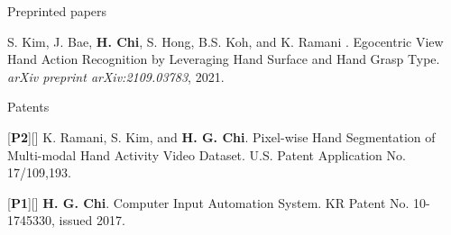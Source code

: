 \begin{cventries}
\cvpub
{Preprinted papers} %
{
\begin{cvitems}
\item {S. Kim, J. Bae, \textbf{H. Chi}, S. Hong, B.S. Koh, and K. Ramani . Egocentric View Hand Action Recognition by Leveraging Hand Surface and Hand Grasp Type. \textit{arXiv preprint arXiv:2109.03783}, 2021. }
\end{cvitems}
}

\cvpub
{Patents}{
\begin{cvitems}
\item {[\textbf{P2}][\href{https://patentimages.storage.googleapis.com/38/0d/99/aaea450434214f/US20210166393A1.pdf}{}] K. Ramani, S. Kim, and \textbf{H. G. Chi}. Pixel-wise Hand Segmentation of Multi-modal Hand Activity Video Dataset. U.S. Patent Application No. 17/109,193.}
\item {[\textbf{P1}][\href{https://docs.google.com/viewer?url=https://github.com/stnoah1/CV/raw/master/documents/patent.pdf}{}] \textbf{H. G. Chi}. Computer Input Automation System. KR Patent No. 10-1745330, issued 2017.}
\end{cvitems}
}



\end{cventries}

